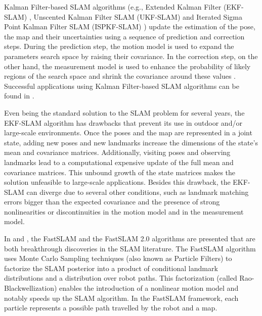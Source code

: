 Kalman Filter-based SLAM algorithms (e.g., Extended Kalman Filter (EKF-SLAM) \cite{08weingarten2005ekf}, Unscented Kalman Filter SLAM (UKF-SLAM) \cite{26thrun2005probabilistic} and Iterated Sigma Point Kalman Filter SLAM (ISPKF-SLAM) \cite{33sibley2006iterated}) update the estimation of the pose, the map and their uncertainties using a sequence of prediction and correction steps. During the prediction step, the motion model is used to expand the parameters search space by raising their covariance. In the correction step, on the other hand, the measurement model is used to enhance the probability of likely regions of the search space and shrink the covariance around these values \cite{07durrant2006simultaneous,34dissanayake2001solution,35maybeck1982stochastic}. Successful applications using Kalman Filter-based SLAM algorithms can be found in \cite{08weingarten2005ekf,36cheein2010slam,37auat2011optimized,38mallios2010ekf,39guivant2001optimization,40guivant2002simultaneous}.

Even being the standard solution to the SLAM problem for several years, the EKF-SLAM algorithm has drawbacks that prevent its use in outdoor and/or large-scale environments. Once the poses and the map are represented in a joint state, adding new poses and new landmarks increase the dimensions of the state's mean and covariance matrices. Additionally, visiting poses and observing landmarks lead to a computational expensive update of the full mean and covariance matrices. This unbound growth of the state matrices makes the solution unfeasible to large-scale applications. Besides this drawback, the EKF-SLAM can diverge due to several other conditions, such as landmark matching errors bigger than the expected covariance and the presence of strong nonlinearities or discontinuities in the motion model and in the measurement model.

In \cite{41montemerlo2002fastslam} and \cite{42montemerlo2007fastslam}, the FastSLAM and the FastSLAM 2.0 algorithms are presented that are both breakthrough discoveries in the SLAM literature. The FastSLAM algorithm uses Monte Carlo Sampling techniques (also known as Particle Filters) to factorize the SLAM posterior into a product of conditional landmark distributions and a distribution over robot paths. This factorization (called Rao-Blackwellization) enables the introduction of a nonlinear motion model and notably speeds up the SLAM algorithm. In the FastSLAM framework, each particle represents a possible path travelled by the robot and a map.


